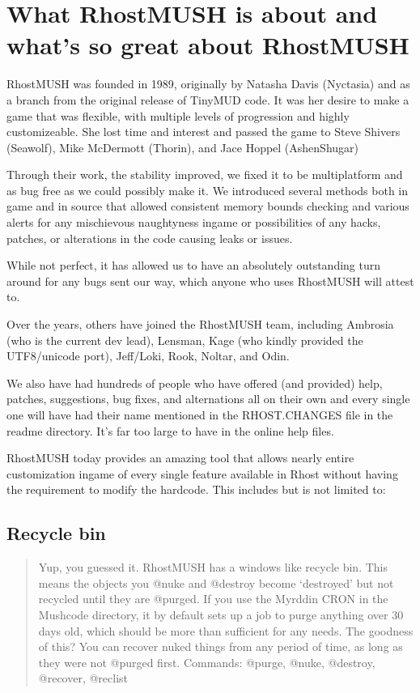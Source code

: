 \documentclass[letterpaper,10pt,english]{sphinxmanual}
\begin{document}
\section{What RhostMUSH is about and what’s so great about RhostMUSH}
\label{\detokenize{features:what-rhostmush-is-about-and-what-s-so-great-about-rhostmush}}\label{\detokenize{features::doc}}
\sphinxAtStartPar
RhostMUSH was founded in 1989, originally by Natasha Davis (Nyctasia) and as
a branch from the original release of TinyMUD code.  It was her desire to make
a game that was flexible, with multiple levels of progression and highly
customizeable.  She lost time and interest and passed the game to
Steve Shivers (Seawolf), Mike McDermott (Thorin), and Jace Hoppel (Ashen\sphinxhyphen{}Shugar)

\sphinxAtStartPar
Through their work, the stability improved, we fixed it to be multi\sphinxhyphen{}platform
and as bug free as we could possibly make it.  We introduced several methods both
in game and in source that allowed consistent memory bounds checking and
various alerts for any mischievous naughtyness in\sphinxhyphen{}game or possibilities of any
hacks, patches, or alterations in the code causing leaks or issues.

\sphinxAtStartPar
While not perfect, it has allowed us to have an absolutely outstanding
turn around for any bugs sent our way, which anyone who uses RhostMUSH will
attest to.

\sphinxAtStartPar
Over the years, others have joined the RhostMUSH team, including Ambrosia
(who is the current dev lead), Lensman, Kage (who kindly provided the
UTF8/unicode port), Jeff/Loki, Rook, Noltar, and Odin.

\sphinxAtStartPar
We also have had hundreds of people who have offered (and provided) help,
patches, suggestions, bug fixes, and alternations all on their own and
every single one will have had their name mentioned in the RHOST.CHANGES
file in the readme directory.  It’s far too large to have in the online
help files.

\sphinxAtStartPar
RhostMUSH today provides an amazing tool that allows nearly entire
customization in\sphinxhyphen{}game of every single feature available in Rhost without
having the requirement to modify the hardcode.  This includes but is
not limited to:


\subsection{Recycle bin}
\label{\detokenize{features:recycle-bin}}\begin{quote}

\sphinxAtStartPar
Yup, you guessed it.  RhostMUSH has a windows like recycle bin.
This means the objects you @nuke and @destroy become ‘destroyed’
but not recycled until they are @purged.  If you use the Myrddin
CRON in the Mushcode directory, it by default sets up a job
to purge anything over 30 days old, which should be more than
sufficient for any needs.  The goodness of this?  You can recover
nuked things from any period of time, as long as they were not
@purged first.
Commands: @purge, @nuke, @destroy, @recover, @reclist
\end{quote}
\end{document}
